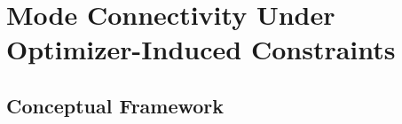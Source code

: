 \documentclass{article}
\begin{document}


\section{Mode Connectivity Under Optimizer-Induced Constraints}
\label{sec:theory}
\subsection{Conceptual Framework}
\label{sec:framework}
\end{document}
